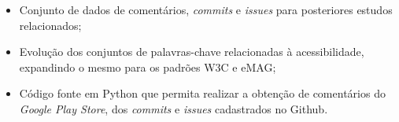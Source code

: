 \begin{itemize}
	\item Conjunto de dados de comentários, \textit{commits} e \textit{issues} para posteriores estudos relacionados;
	\item Evolução dos conjuntos de palavras-chave relacionadas à acessibilidade, expandindo o mesmo para os padrões W3C e eMAG;
	\item Código fonte em Python que permita realizar a obtenção de comentários do \textit{Google Play Store}, dos \textit{commits} e \textit{issues} cadastrados no Github.
\end{itemize}






